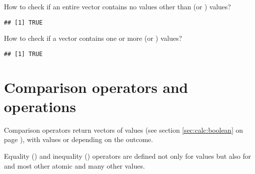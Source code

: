 \documentclass[krantz2]{krantz}\usepackage{knitr}
\begin{document}
\begin{faqbox}{How to check if an entire vector contains no values other than  (or ) values?}
\begin{knitrout}\footnotesize
{}\color{fgcolor}\begin{kframe}
\begin{alltt}
 \hlkwb{<-} \hlstd{(}\hlstd{,} \hlstd{)}
\hlstd{(}
\end{alltt}
\begin{verbatim}
## [1] TRUE
\end{verbatim}
\end{kframe}
\end{knitrout}

\end{faqbox}

\begin{faqbox}{How to check if a vector contains one or more  (or ) values?}
\begin{knitrout}\footnotesize
{}\color{fgcolor}\begin{kframe}
\begin{alltt}
 \hlkwb{<-} \hlstd{(}\hlstd{,} \hlstd{)}
\hlstd{(}
\end{alltt}
\begin{verbatim}
## [1] TRUE
\end{verbatim}
\end{kframe}
\end{knitrout}

\end{faqbox}

\section{Comparison operators and operations}\label{sec:calc:comparison}
\qRoperator{>}\qRoperator{<}\qRoperator{>=}\qRoperator{<=}\qRoperator{==}\qRoperator{!=}
Comparison operators return vectors of  values (see section \ref{sec:calc:boolean} on page \pageref{sec:calc:boolean}), with values  or  depending on the outcome.

Equality (\code{==}) and inequality (\code{!=}) operators are defined not only for  values but also for  and most other atomic and many other values.
\end{document}
